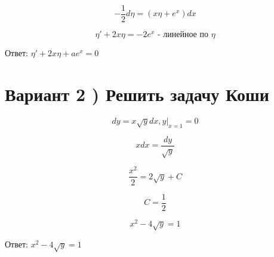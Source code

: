 \documentclass[a4paper]{article}
\begin{document}
\begin{equation*}
-\frac{1}{2}d\eta = (x\eta + e^x)dx
\end{equation*}

\begin{equation*}
\eta' + 2x\eta = -2e^x \text{ - линейное по } \eta
\end{equation*}

Ответ: $\eta' + 2x\eta + ae^x = 0$

\section*{Вариант 2 ) Решить задачу Коши}

\begin{equation*}
dy = x\sqrt{y} dx,y|_{x=1} = 0
\end{equation*}

\begin{equation*}
xdx = \frac{dy}{\sqrt{y}}
\end{equation*}

\begin{equation*}
\frac{x^2}{2} = 2\sqrt{y} + C
\end{equation*}

\begin{equation*}
C = \frac{1}{2}
\end{equation*}

\begin{equation*}
x^2 - 4\sqrt{y} = 1
\end{equation*}

Ответ: $x^2 - 4\sqrt{y} = 1$
\end{document}
